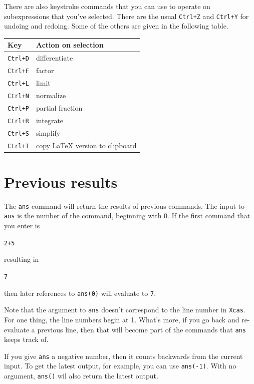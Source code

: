 \documentclass[a4paper,11pt]{book}
\begin{document}
There are also keystroke commands that you can use to operate
on subexpressions that you've selected.  There are the usual
\texttt{Ctrl+Z} and \texttt{Ctrl+Y} for undoing and redoing.  Some of
the others are given in the following table.

\begin{center}
\begin{tabular}{|p{}|p{}|}
\hline
\textbf{Key} & \textbf{Action on selection}\\
\hline\hline
\texttt{Ctrl+D}   & differentiate\\
\texttt{Ctrl+F} & factor\\
\texttt{Ctrl+L} & limit\\
\texttt{Ctrl+N} & normalize\\
\texttt{Ctrl+P} & partial fraction\\
\texttt{Ctrl+R} & integrate\\
\texttt{Ctrl+S} & simplify\\
\texttt{Ctrl+T} & copy \LaTeX{} version to clipboard\\
\hline
\end{tabular}
\end{center}

\section{Previous results}

The \texttt{ans} command will return the results of previous commands.
The input to \texttt{ans} is the number of the command, beginning with
0.  If the first command that you enter is 
\begin{center}
  {\tt 2+5}
\end{center}
resulting in
\begin{center}
  {\tt 7}
\end{center}
then later references to \texttt{ans(0)} will evaluate to \texttt{7}.

Note that the argument to \texttt{ans} doesn't correspond to the line
number in \texttt{Xcas}.  For one thing, the line numbers begin at 1.
What's more, if you go back and re-evaluate a previous line, then that
will become part of the commands that \texttt{ans} keeps track of.

If you give \texttt{ans} a negative number, then it counts backwards
from the current input.  To get the latest output, for
example, you can use \texttt{ans(-1)}.    With no argument,
\texttt{ans()} wil also return the latest output.
\end{document}
